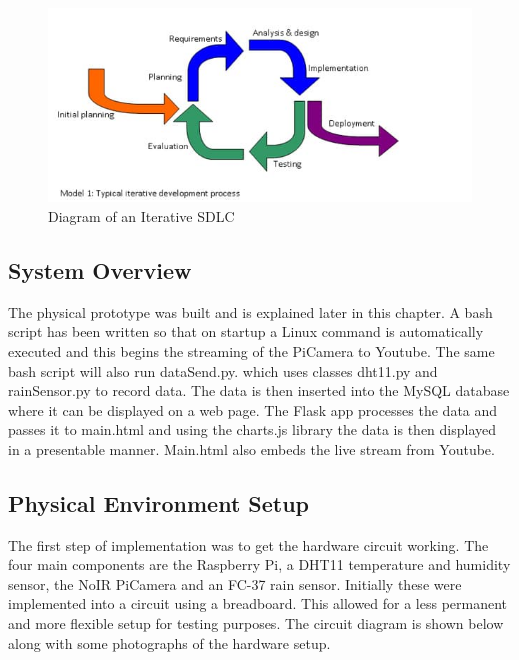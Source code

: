 \documentclass[10pt,a4paper]{article}
\begin{document}
\begin{figure}[H]
  \centering
    \includegraphics[width=\linewidth]{images/iterativemodel.jpg}
    \caption{Diagram of an Iterative SDLC}
    \label{fig:iterativemodel}
\end{figure}

\subsection{System Overview}
The physical prototype was built and is explained later in this chapter. A bash script has been written so that on startup a Linux command is automatically executed and this begins the streaming of the PiCamera to Youtube. The same bash script will also run dataSend.py. which uses classes dht11.py and rainSensor.py to record data. The data is then inserted into the MySQL database where it can be displayed on a web page. The Flask app processes the data and passes it to main.html and using the charts.js library the data is then displayed in a presentable manner. Main.html also embeds the live stream from Youtube. 

\subsection{Physical Environment Setup}
The first step of implementation was to get the hardware circuit working. The four main components are the Raspberry Pi, a DHT11 temperature and humidity sensor, the NoIR PiCamera and an FC-37 rain sensor. Initially these were implemented into a circuit using a breadboard. This allowed for a less permanent and more flexible setup for testing purposes. The circuit diagram is shown below along with some photographs of the hardware setup. 
\end{document}
